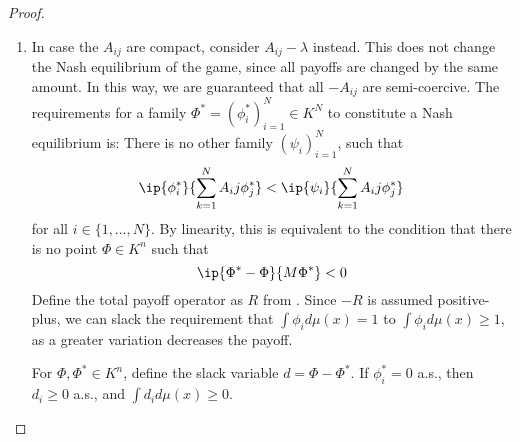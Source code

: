 \begin{proof}
  \begin{enumerate}
    \item
    In case the $A_{ij}$ are compact, consider $A_{ij}-\lambda$ instead. This does not change the Nash equilibrium of the game, since all payoffs are changed by the same amount. In this way, we are guaranteed that all $-A_{ij}$ are semi-coercive.
    The requirements for a family $\Phi^*=(\phi_i^*)_{i=1}^N \in K^N$ to constitute a Nash equilibrium is: There is no other family $(\psi_i)_{i=1}^N$, such that
    \begin{equation}
        \ip{\phi_i^*}{\sum_{k=1}^N A_ij \phi_j^*} < \ip{\psi_i}{\sum_{k=1}^N A_ij \phi_j^*}
    \end{equation}
    for all $i\in \{1,\dots,N\}$.
    By linearity, this is equivalent to the condition that there is no point $\Phi \in K^n$ such that
    \begin{equation}
      \ip{\Phi^*-\Phi}{M \Phi^*} < 0
    \end{equation}
    Define the total payoff operator as $R$ from . Since $-R$ is assumed positive-plus, we can slack the requirement that $\int \phi_i d\mu(x)=1$ to $\int \phi_i d\mu(x) \geq 1$, as a greater variation decreases the payoff.

    For $\Phi, \Phi^* \in K^n$, define the slack variable $d = \Phi - \Phi^*$. If $\phi_i^* = 0$ a.s., then $d_i \geq 0$ a.s., and $\int d_i d\mu(x) \geq 0$.


\end{enumerate}
\end{proof}
